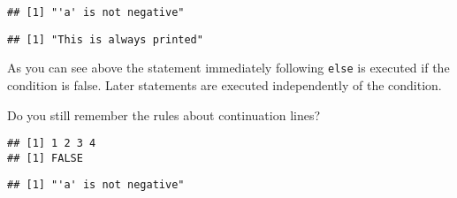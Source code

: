 \documentclass[paper=a4,10pt,div=17,headsepline,BCOR=12mm,twoside,open=right]{scrbook}\usepackage{knitr}
\begin{document}
\begin{knitrout}\footnotesize
{}\color{fgcolor}\begin{kframe}
\begin{alltt}
 \hlkwb{<-} 
  \hlopt{<} \hlstd{)} \hlstd{(}\hlstd{)}  \hlstd{(}\hlstd{)}
\end{alltt}
\begin{verbatim}
## [1] "'a' is not negative"
\end{verbatim}
\begin{alltt}
\hlstd{(}\hlstd{)}
\end{alltt}
\begin{verbatim}
## [1] "This is always printed"
\end{verbatim}
\end{kframe}
\end{knitrout}

As you can see above the statement immediately following \texttt{else} is executed if the condition is false. Later statements are executed independently of the condition.

Do you still remember the rules about continuation lines?

\begin{knitrout}\footnotesize
{}\color{fgcolor}\begin{kframe}
\begin{verbatim}
## [1] 1 2 3 4
## [1] FALSE
\end{verbatim}
\end{kframe}
\end{knitrout}

\begin{knitrout}\footnotesize
{}\color{fgcolor}\begin{kframe}
\begin{alltt}
 \hlkwb{<-} 
  \hlopt{<} \hlstd{)}
  \hlstd{(}\hlstd{)} 
    \hlstd{(}\hlstd{)}
\end{alltt}
\begin{verbatim}
## [1] "'a' is not negative"
\end{verbatim}
\end{kframe}
\end{knitrout}
\end{document}
